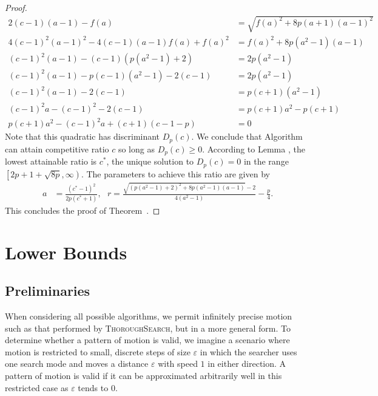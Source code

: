 \begin{proof}
  \begin{align*}
    2(c-1)(a-1) - f(a) &= \sqrt{f(a)^2+8p(a+1)(a-1)^2} \\
    4(c-1)^2(a-1)^2 - 4(c-1)(a-1)f(a) + f(a)^2 &= f(a)^2+8p(a^2-1)(a-1) \\
    (c-1)^2(a-1) - (c-1)\left(p(a^2-1)+2\right) &= 2p(a^2-1) \\
    (c-1)^2(a-1) - p(c-1)(a^2-1) - 2(c-1) &= 2p(a^2-1) \\
    (c-1)^2(a-1) - 2(c-1) &= p(c+1)(a^2-1) \\
    (c-1)^2a - (c-1)^2 - 2(c-1) &= p(c+1)a^2 - p(c+1) \\
    p(c+1)a^2 - (c-1)^2a + (c+1)\left(c-1-p\right) &= 0
  \end{align*}
  Note that this quadratic has discriminant $D_p(c)$. We conclude that Algorithm  can attain competitive ratio $c$ so long as $D_p(c) \geq 0$. According to Lemma , the lowest attainable ratio is $c^*$, the unique solution to $D_p(c) = 0$ in the range $\left[2p+1+\sqrt{8p},\infty\right)$. The parameters to achieve this ratio are given by
  \begin{align*}
    a &= \frac{(c^*-1)^2}{2p(c^*+1)}, ~~~
    r = \frac{\sqrt{\left(p(a^2-1)+2\right)^2+8p(a^2-1)(a-1)}-2}{4(a^2-1)}-\frac{p}{4} .
  \end{align*}
  This concludes the proof of Theorem~.
\end{proof}

\section{Lower Bounds}

\subsection{Preliminaries}
When considering all possible algorithms, we permit infinitely precise motion such as that performed by \textsc{ThoroughSearch}, but in a more general form. To determine whether a pattern of motion is valid, we imagine a scenario where motion is restricted to small, discrete steps of size $\varepsilon$ in which the searcher uses one search mode and moves a distance $\varepsilon$ with speed $1$ in either direction. A pattern of motion is valid if it can be approximated arbitrarily well in this restricted case as $\varepsilon$ tends to $0$.

